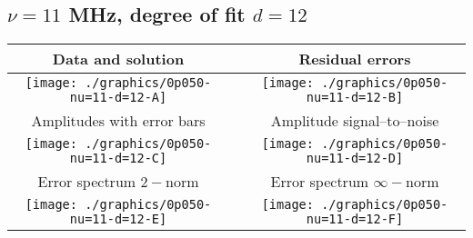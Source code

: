 

% 

\clearpage{}
\break{}

\subsection{$\nu = 11$ MHz, degree of fit $d = 12$}

\begin{table}[h]
    \begin{center}
        \begin{tabular}{ccc}
            Data and solution & \quad & Residual errors \\\hline
            \texttt{[image: ./graphics/0p050-nu=11-d=12-A]} &&
            \texttt{[image: ./graphics/0p050-nu=11-d=12-B]} \\[15pt]
            Amplitudes with error bars && Amplitude signal--to--noise \\\hline
            \texttt{[image: ./graphics/0p050-nu=11-d=12-C]} &&
            \texttt{[image: ./graphics/0p050-nu=11-d=12-D]} \\[15pt]
            Error spectrum $2-$norm && Error spectrum $\infty-$norm \\\hline
            \texttt{[image: ./graphics/0p050-nu=11-d=12-E]} &&
            \texttt{[image: ./graphics/0p050-nu=11-d=12-F]} \\[15pt]
        \end{tabular}
    \end{center}
\label{fig:elev=50, nu=11}
\end{table}



\endinput
